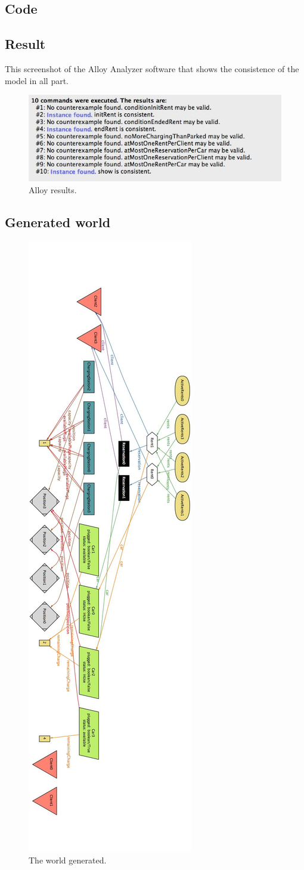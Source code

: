 \subsection{Code}


\subsection{Result}
This screenshot of the Alloy Analyzer software that shows the consistence of the model in all part.

\begin{figure}[h]
\centering
\includegraphics[width=450 pt]{resources/alloyResults.jpg}
\caption{\label{fig:AlloyRes}Alloy results.}
\end{figure}

\newpage
\subsection{Generated world}

\begin{figure}[hp]
\centering
\includegraphics[height=526 pt]{resources/generatedWorld.jpg}
\caption{\label{fig:AlloyWorld}The world generated.}
\end{figure}